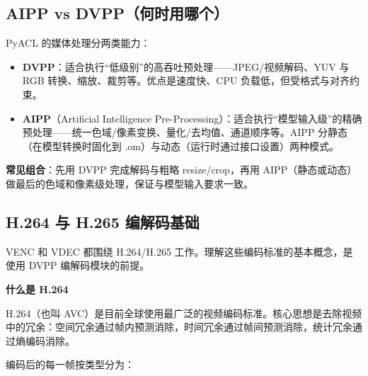 \subsection{AIPP vs DVPP（何时用哪个）}\label{src-book-chapter6-h3}

PyACL 的媒体处理分两类能力：

\begin{itemize}
\tightlist
\item
  \textbf{DVPP}：适合执行``低级别''的高吞吐预处理------JPEG/视频解码、YUV
  与 RGB 转换、缩放、裁剪等。优点是速度快、CPU
  负载低，但受格式与对齐约束。
\item
  \textbf{AIPP}（Artificial Intelligence
  Pre-Processing）：适合执行``模型输入级''的精确预处理------统一色域/像素变换、量化/去均值、通道顺序等。AIPP
  分静态（在模型转换时固化到 .om）与动态（运行时通过接口设置）两种模式。
\end{itemize}

\textbf{常见组合}：先用 DVPP 完成解码与粗略 resize/crop，再用
AIPP（静态或动态）做最后的色域和像素级处理，保证与模型输入要求一致。

\subsection{H.264 与 H.265 编解码基础}\label{h264-h265-basics}

VENC 和 VDEC 都围绕 H.264/H.265 工作。理解这些编码标准的基本概念，是使用
DVPP 编解码模块的前提。

\textbf{什么是 H.264}

H.264（也叫
AVC）是目前全球使用最广泛的视频编码标准。核心思想是去除视频中的冗余：空间冗余通过帧内预测消除，时间冗余通过帧间预测消除，统计冗余通过熵编码消除。

编码后的每一帧按类型分为：

